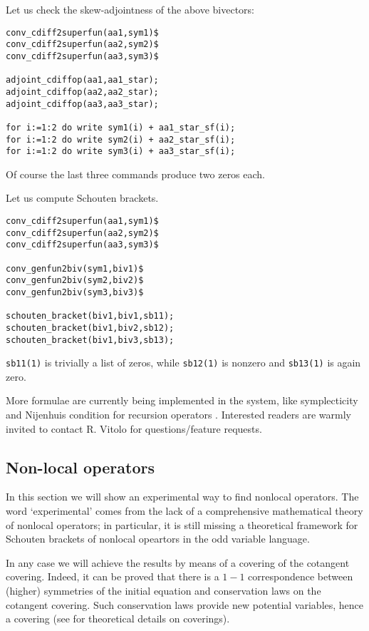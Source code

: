 Let us check the skew-adjointness of the above bivectors:
\begin{verbatim}
conv_cdiff2superfun(aa1,sym1)$
conv_cdiff2superfun(aa2,sym2)$
conv_cdiff2superfun(aa3,sym3)$

adjoint_cdiffop(aa1,aa1_star);
adjoint_cdiffop(aa2,aa2_star);
adjoint_cdiffop(aa3,aa3_star);

for i:=1:2 do write sym1(i) + aa1_star_sf(i);
for i:=1:2 do write sym2(i) + aa2_star_sf(i);
for i:=1:2 do write sym3(i) + aa3_star_sf(i);
\end{verbatim}
Of course the last three commands produce two zeros each.

Let us compute Schouten brackets.
\begin{verbatim}
conv_cdiff2superfun(aa1,sym1)$
conv_cdiff2superfun(aa2,sym2)$
conv_cdiff2superfun(aa3,sym3)$

conv_genfun2biv(sym1,biv1)$
conv_genfun2biv(sym2,biv2)$
conv_genfun2biv(sym3,biv3)$

schouten_bracket(biv1,biv1,sb11);
schouten_bracket(biv1,biv2,sb12);
schouten_bracket(biv1,biv3,sb13);
\end{verbatim}
\texttt{sb11(1)} is trivially a list of zeros, while \texttt{sb12(1)} is
nonzero and \texttt{sb13(1)} is again zero.

\medskip

More formulae are currently being implemented in the system, like symplecticity
and Nijenhuis condition for recursion operators \cite{KerstenKrasilshchikVerboretsky:2006}. Interested readers
are warmly invited to contact R. Vitolo for questions/feature requests.


\subsection{Non-local operators}
\label{cdesec:non-local-hamilt}

In this section we will show an experimental way to find nonlocal
operators. The word `experimental' comes from the lack of a comprehensive
mathematical theory of nonlocal operators; in particular, it is still missing a
theoretical framework for Schouten brackets of nonlocal opeartors in the odd
variable language.

In any case we will achieve the results by means of a covering of the cotangent
covering.  Indeed, it can be proved that there is a $1-1$ correspondence
between (higher) symmetries of the initial equation and conservation laws on
the cotangent covering. Such conservation laws provide new potential variables,
hence a covering (see \cite{Krasilshchik:99} for theoretical details on coverings).

